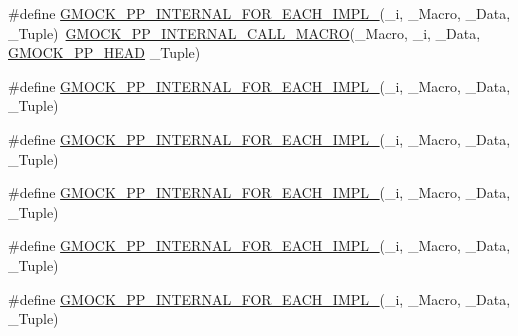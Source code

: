 \begin{DoxyCompactItemize}
\item 
\#define \mbox{\hyperlink{_obj__test_2lib_2googletest-master_2googlemock_2include_2gmock_2internal_2gmock-pp_8h_a6dde0a6b2371de18b44f8671b8d0dc22}{G\+M\+O\+C\+K\+\_\+\+P\+P\+\_\+\+I\+N\+T\+E\+R\+N\+A\+L\+\_\+\+F\+O\+R\+\_\+\+E\+A\+C\+H\+\_\+\+I\+M\+P\+L\+\_}}(\+\_\+i,  \+\_\+\+Macro,  \+\_\+\+Data,  \+\_\+\+Tuple)~\mbox{\hyperlink{_obj__test_2lib_2googletest-master_2googlemock_2include_2gmock_2internal_2gmock-pp_8h_a3fe0cf255d103cc945cd91e0e953846f}{G\+M\+O\+C\+K\+\_\+\+P\+P\+\_\+\+I\+N\+T\+E\+R\+N\+A\+L\+\_\+\+C\+A\+L\+L\+\_\+\+M\+A\+C\+RO}}(\+\_\+\+Macro, \+\_\+i, \+\_\+\+Data, \mbox{\hyperlink{_obj__test_2lib_2googletest-master_2googlemock_2include_2gmock_2internal_2gmock-pp_8h_ad7910160dfc0fb20b239efcf1f3ddd85}{G\+M\+O\+C\+K\+\_\+\+P\+P\+\_\+\+H\+E\+AD}} \+\_\+\+Tuple)
\item 
\#define \mbox{\hyperlink{_obj__test_2lib_2googletest-master_2googlemock_2include_2gmock_2internal_2gmock-pp_8h_ad8277a9a0a83d35b403223078486756e}{G\+M\+O\+C\+K\+\_\+\+P\+P\+\_\+\+I\+N\+T\+E\+R\+N\+A\+L\+\_\+\+F\+O\+R\+\_\+\+E\+A\+C\+H\+\_\+\+I\+M\+P\+L\+\_}}(\+\_\+i,  \+\_\+\+Macro,  \+\_\+\+Data,  \+\_\+\+Tuple)
\item 
\#define \mbox{\hyperlink{_obj__test_2lib_2googletest-master_2googlemock_2include_2gmock_2internal_2gmock-pp_8h_a2ae498910fad6a0796cdc24e7436c1af}{G\+M\+O\+C\+K\+\_\+\+P\+P\+\_\+\+I\+N\+T\+E\+R\+N\+A\+L\+\_\+\+F\+O\+R\+\_\+\+E\+A\+C\+H\+\_\+\+I\+M\+P\+L\+\_}}(\+\_\+i,  \+\_\+\+Macro,  \+\_\+\+Data,  \+\_\+\+Tuple)
\item 
\#define \mbox{\hyperlink{_obj__test_2lib_2googletest-master_2googlemock_2include_2gmock_2internal_2gmock-pp_8h_ac8edd023c5a089a51b8ec78a12a37941}{G\+M\+O\+C\+K\+\_\+\+P\+P\+\_\+\+I\+N\+T\+E\+R\+N\+A\+L\+\_\+\+F\+O\+R\+\_\+\+E\+A\+C\+H\+\_\+\+I\+M\+P\+L\+\_}}(\+\_\+i,  \+\_\+\+Macro,  \+\_\+\+Data,  \+\_\+\+Tuple)
\item 
\#define \mbox{\hyperlink{_obj__test_2lib_2googletest-master_2googlemock_2include_2gmock_2internal_2gmock-pp_8h_a3a7b6250eb5ceec84c604088b69f88ca}{G\+M\+O\+C\+K\+\_\+\+P\+P\+\_\+\+I\+N\+T\+E\+R\+N\+A\+L\+\_\+\+F\+O\+R\+\_\+\+E\+A\+C\+H\+\_\+\+I\+M\+P\+L\+\_}}(\+\_\+i,  \+\_\+\+Macro,  \+\_\+\+Data,  \+\_\+\+Tuple)
\item 
\#define \mbox{\hyperlink{_obj__test_2lib_2googletest-master_2googlemock_2include_2gmock_2internal_2gmock-pp_8h_a8a0eb9f1389af438da01467e915fce2c}{G\+M\+O\+C\+K\+\_\+\+P\+P\+\_\+\+I\+N\+T\+E\+R\+N\+A\+L\+\_\+\+F\+O\+R\+\_\+\+E\+A\+C\+H\+\_\+\+I\+M\+P\+L\+\_}}(\+\_\+i,  \+\_\+\+Macro,  \+\_\+\+Data,  \+\_\+\+Tuple)

\end{DoxyCompactItemize}
